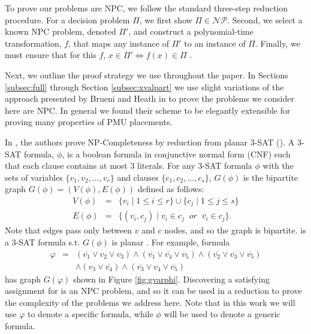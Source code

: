 To prove our problems are NPC, we follow the standard three-step reduction procedure. For a decision problem $\Pi$, we first show $\Pi\in\mathcal{NP}$. Second, we select a known NPC problem, denoted $\Pi'$,
and construct a polynomial-time transformation, $f$, that maps any instance of $\Pi'$  to an instance of $\Pi$. Finally, we must ensure that for this $f$,  $x\in\Pi'\Leftrightarrow f(x)\in\Pi$ \cite{Garey79}.

Next, we outline the proof strategy we use throughout the paper. In Sections  \ref{subsec:full} through Section \ref{subsec:xvalpart} we use slight variations of the approach presented
by Brueni and Heath in \cite{Brueni05} to prove the problems we consider here are NPC. In general we found their scheme to be elegantly extensible for proving many properties of PMU placements.

In \cite{Brueni05}, the authors prove NP-Completeness by reduction from planar 3-SAT (\sats). A 3-SAT formula, $\phi$, is a boolean formula in conjunctive normal form (CNF) such that each clause contains at most $3$ literals. For any 3-SAT formula $\phi$ with the sets of variables $\{v_1,v_2, \dots , v_r\}$ and clauses $\{c_1,c_2, \dots , c_s \}$, $G(\phi)$ is the bipartite graph $G(\phi)=(V(\phi),E(\phi))$ defined as follows:
\begin{eqnarray*}
 V(\phi) &= &\{v_i\; \vert\; 1 \leq i \leq r \} \cup \{c_j \;\vert\; 1 \leq j \leq s \} \\
 E(\phi) &=& \{ (v_i,c_j)\;\vert\; v_i \in c_j\;\; or \;\; \overline{v_i} \in c_j\}.
\end{eqnarray*}
Note that edges pass only between $v$ and $c$ nodes, and so the graph is bipartite.  \sat is a 3-SAT formula s.t.  $G(\phi)$ is planar \cite{Lich82}. For example, \sat formula
\begin{eqnarray}
	 \varphi &=& (\overline{v_1} \vee v_2 \vee v_3) \wedge (\overline{v_1} \vee \overline{v_4} \vee v_5) \wedge (\overline{v_2} \vee \overline{v_3} \vee \overline{v_5}) \nonumber\\
	 & & \wedge (v_3 \vee \overline{v_4}) \wedge  (\overline{v_3} \vee v_4 \vee \overline{v_5})
\label{eqn:varphi}
\end{eqnarray}
has graph $G(\varphi)$ shown in Figure \ref{fig:gvarphi}. Discovering a satisfying assignment for  \sat is an NPC problem, and so it can be used in a reduction to prove the complexity of the problems we address here. Note that in this work we will use $\varphi$ to denote a specific \sat formula, while $\phi$ will be used to denote a generic \sat formula.

